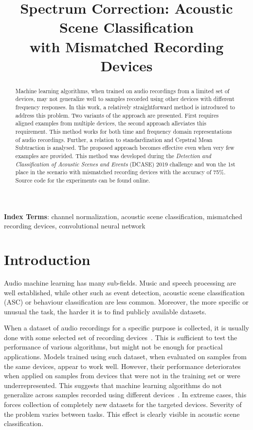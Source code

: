 \documentclass[a4paper]{article}
\title{Spectrum Correction: Acoustic Scene Classification \\with Mismatched Recording Devices}
\begin{document}
\maketitle
\begin{abstract}
  Machine learning algorithms, when trained on audio recordings from a limited set of devices, may not generalize well to samples recorded using other devices with different frequency responses. In this work, a relatively straightforward method is introduced to address this problem. Two variants of the approach are presented. First requires aligned examples from multiple devices, the second approach alleviates this requirement. This method works for both time and frequency domain representations of audio recordings. Further, a relation to standardization and Cepstral Mean Subtraction is analysed. The proposed approach becomes effective even when very few examples are provided. This method was developed during the \textit{Detection and Classification of Acoustic Scenes and Events} (DCASE) 2019 challenge and won the 1st place in the scenario with mismatched recording devices with the accuracy of 75\%. Source code for the experiments can be found online.
\end{abstract}
\noindent\textbf{Index Terms}: channel normalization, acoustic scene classification, mismatched recording devices, convolutional neural network

\section{Introduction}
\label{sec:intro}

Audio machine learning has many sub-fields. Music and speech processing are well established, while other such as event detection, acoustic scene classification (ASC) or behaviour classification are less common. Moreover, the more specific or unusual the task, the harder it is to find publicly available datasets.

When a dataset of audio recordings for a specific purpose is collected, it is usually done with some selected set of recording devices~\cite{ami, dcase}. This is sufficient to test the performance of various algorithms, but might not be enough for practical applications. Models trained using such dataset, when evaluated on samples from the same devices, appear to work well. However, their performance deteriorates when applied on samples from devices that were not in the training set or were underrepresented. This suggests that machine learning algorithms do not generalize across samples recorded using different devices~\cite{sternSignalProcessingRobust1996, transfer-wireless, truc, da-asc,svm-analysis}. In extreme cases, this forces collection of completely new datasets for the targeted devices. Severity of the problem varies between tasks. This effect is clearly visible in acoustic scene classification.
\end{document}
